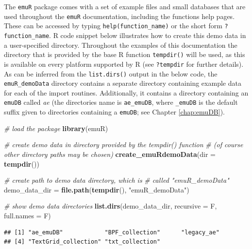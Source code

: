 \documentclass[]{book}
\newenvironment{Shaded}{\begin{snugshade}}{\end{snugshade}}
\newcommand{\CommentTok}[1]{\textcolor[rgb]{0.56,0.35,0.01}{\textit{#1}}}
\newcommand{\DataTypeTok}[1]{\textcolor[rgb]{0.13,0.29,0.53}{#1}}
\newcommand{\KeywordTok}[1]{\textcolor[rgb]{0.13,0.29,0.53}{\textbf{#1}}}
\newcommand{\NormalTok}[1]{#1}
\newcommand{\StringTok}[1]{\textcolor[rgb]{0.31,0.60,0.02}{#1}}
\theoremstyle{definition}
\theoremstyle{definition}
\theoremstyle{definition}
\theoremstyle{remark}
\begin{document}
The \texttt{emuR} package comes with a set of example files and small
databases that are used throughout the \texttt{emuR} documentation,
including the functions help pages. These can be accessed by typing
\texttt{help(function\_name)} or the short form
\texttt{?function\_name}. R code snippet below illustrates how to create
this demo data in a user-specified directory. Throughout the examples of
this documentation the directory that is provided by the base R function
\texttt{tempdir()} will be used, as this is available on every platform
supported by R (see \texttt{?tempdir} for further details). As can be
inferred from the \texttt{list.dirs()} output in the below code, the
\texttt{emuR\_demoData} directory contains a separate directory
containing example data for each of the import routines. Additionally,
it contains a directory containing an \texttt{emuDB} called \emph{ae}
(the directories name is \texttt{ae\_emuDB}, where \texttt{\_emuDB} is
the default suffix given to directories containing a \texttt{emuDB}; see
Chapter \ref{chap:emuDB}).

\begin{Shaded}
\begin{Highlighting}[]
\CommentTok{# load the package}
\KeywordTok{library}\NormalTok{(emuR)}

\CommentTok{# create demo data in directory provided by the tempdir() function}
\CommentTok{# (of course other directory paths may be chosen)}
\KeywordTok{create_emuRdemoData}\NormalTok{(}\DataTypeTok{dir =} \KeywordTok{tempdir}\NormalTok{())}

\CommentTok{# create path to demo data directory, which is}
\CommentTok{# called "emuR_demoData"}
\NormalTok{demo_data_dir =}\StringTok{ }\KeywordTok{file.path}\NormalTok{(}\KeywordTok{tempdir}\NormalTok{(), }\StringTok{"emuR_demoData"}\NormalTok{)}

\CommentTok{# show demo data directories}
\KeywordTok{list.dirs}\NormalTok{(demo_data_dir, }\DataTypeTok{recursive =}\NormalTok{ F, }\DataTypeTok{full.names =}\NormalTok{ F)}
\end{Highlighting}
\end{Shaded}

\begin{verbatim}
## [1] "ae_emuDB"            "BPF_collection"      "legacy_ae"          
## [4] "TextGrid_collection" "txt_collection"
\end{verbatim}
\end{document}
